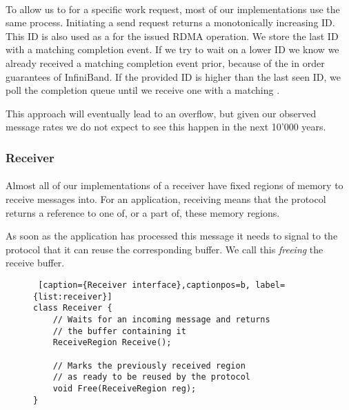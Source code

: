 \paragraph{} To allow us to  for a specific work request, most of our implementations use the same process. 
Initiating a send request returns a monotonically increasing ID. This ID is also used as a  for the issued RDMA
operation. We store the last ID with a matching completion event. If we try to wait on a lower ID we know we already received 
a matching completion event prior, because of the in order guarantees of InfiniBand. If the provided ID is higher than the
last seen ID, we poll the completion queue until we receive one with a matching .

This approach will eventually lead to an overflow, but given our observed  message rates we do not expect to see this 
happen in the next 10'000 years. 

\subsubsection{Receiver}

\paragraph{} Almost all of our implementations of a receiver have fixed regions of memory to receive messages into. 
For an application, receiving means that the protocol returns a reference to one of, or a part of, these memory regions. 

As soon as the application  has processed this message it needs to signal to the protocol that it can reuse the corresponding
buffer. We call this \emph{freeing} the receive buffer.

\begin{figure}[htp]
\begin{lstlisting} [caption={Receiver interface},captionpos=b, label={list:receiver}] 
class Receiver {
    // Waits for an incoming message and returns
    // the buffer containing it
    ReceiveRegion Receive();

    // Marks the previously received region 
    // as ready to be reused by the protocol
    void Free(ReceiveRegion reg);
}
\end{lstlisting}
\end{figure}






